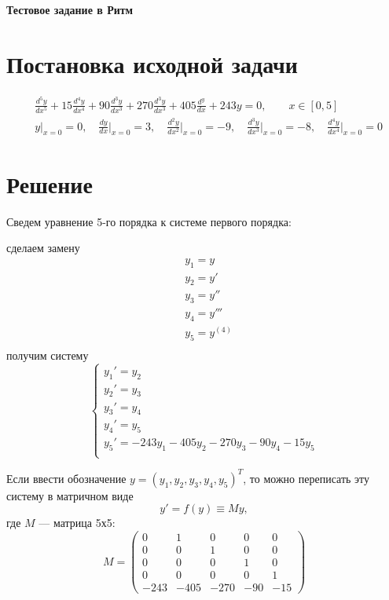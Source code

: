 \documentclass{article}
\begin{document}
\Large\textbf{Тестовое задание в Ритм}

\section{Постановка исходной задачи}

\begin{align*}
    &\frac{d^5y}{dx^5} + 15\frac{d^4y}{dx^4} + 90\frac{d^3y}{dx^3} + 270\frac{d^3y}{dx^3} + 405\frac{d^y}{dx} + 243y = 0, \qquad x \in [0,5] \\
    &y\bigg|_{x=0} = 0, \quad \frac{dy}{dx}\bigg|_{x=0} = 3, \quad \frac{d^2y}{dx^2}\bigg|_{x=0} = -9, \quad \frac{d^3y}{dx^3}\bigg|_{x=0} = -8, \quad \frac{d^4y}{dx^4}\bigg|_{x=0} = 0
\end{align*}

\section{Решение}

Сведем уравнение 5-го порядка к системе первого порядка:

сделаем замену
\begin{align*}
    &y_1 = y\\
    &y_2 = y'\\
    &y_3 = y''\\
    &y_4 = y'''\\
    &y_5 = y^{(4)}\\
\end{align*}
получим систему
$$\begin{cases}
    y_1' = y_2\\
    y_2' = y_3\\
    y_3' = y_4\\
    y_4' = y_5\\
    y_5' = -243y_1 - 405y_2 - 270y_3 - 90y_4 - 15y_5\\
\end{cases}$$

Если ввести обозначение $y = (y_1, y_2, y_3, y_4, y_5)^T$, то можно переписать эту систему в матричном виде
$$y' = f(y) \equiv My,$$
где $M$ --- матрица 5х5:
$$ M = 
\begin{pmatrix}
    0 & 1 & 0 & 0 & 0\\
    0 & 0 & 1 & 0 & 0\\
    0 & 0 & 0 & 1 & 0\\
    0 & 0 & 0 & 0 & 1\\
    -243 & -405 & -270 & -90 & -15
\end{pmatrix}
$$
\end{document}
